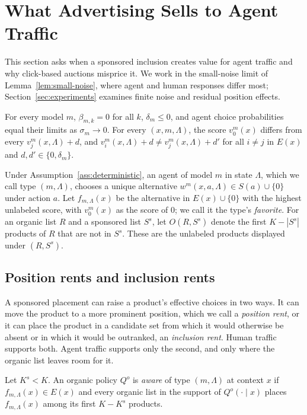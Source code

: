 \documentclass[opre,dblanonrev]{informs4}
\providecommand{\1}{\mathbf{1}}
\begin{document}
\section{What Advertising Sells to Agent Traffic}\label{sec:mechanism}

This section asks when a sponsored inclusion creates value for agent traffic and why click-based auctions misprice it. We work in the small-noise limit of Lemma~\ref{lem:small-noise}, where agent and human responses differ most; Section~\ref{sec:experiments} examines finite noise and residual position effects.

\begin{assumption}\label{ass:deterministic}
For every model $m$, $\beta_{m,k}=0$ for all $k$, $\delta_m\le0$, and agent choice probabilities equal their limits as $\sigma_m\to0$. For every $(x,m,\Lambda)$, the score $v_0^m(x)$ differs from every $v_j^m(x,\Lambda)+d$, and $v_i^m(x,\Lambda)+d\ne v_j^m(x,\Lambda)+d'$ for all $i\ne j$ in $E(x)$ and $d,d'\in\{0,\delta_m\}$.
\end{assumption}

Under Assumption~\ref{ass:deterministic}, an agent of model $m$ in state $\Lambda$, which we call type $(m,\Lambda)$, chooses a unique alternative $w^m(x,a,\Lambda)\in S(a)\cup\{0\}$ under action $a$. Let $f_{m,\Lambda}(x)$ be the alternative in $E(x)\cup\{0\}$ with the highest unlabeled score, with $v_0^m(x)$ as the score of $0$; we call it the type's \emph{favorite}. For an organic list $R$ and a sponsored list $S^s$, let $O(R,S^s)$ denote the first $K-|S^s|$ products of $R$ that are not in $S^s$. These are the unlabeled products displayed under $(R,S^s)$.

\subsection{Position rents and inclusion rents}\label{sec:mechanism-rents}

A sponsored placement can raise a product's effective choices in two ways. It can move the product to a more prominent position, which we call a \emph{position rent}, or it can place the product in a candidate set from which it would otherwise be absent or in which it would be outranked, an \emph{inclusion rent}. Human traffic supports both. Agent traffic supports only the second, and only where the organic list leaves room for it.

\begin{definition}\label{def:aware}
Let $K^s<K$. An organic policy $Q^o$ is \emph{aware} of type $(m,\Lambda)$ at context $x$ if $f_{m,\Lambda}(x)\in E(x)$ and every organic list in the support of $Q^o(\cdot\mid x)$ places $f_{m,\Lambda}(x)$ among its first $K-K^s$ products.
\end{definition}
\end{document}
